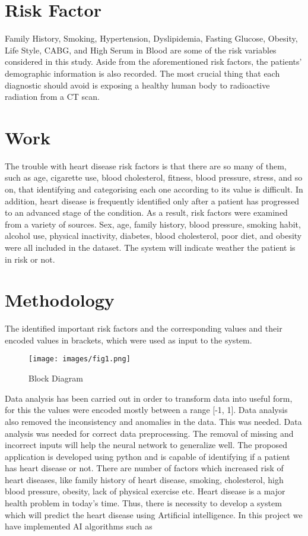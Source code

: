 \documentclass{article}
\begin{document}
\section{Risk Factor}
Family History, Smoking, Hypertension, Dyslipidemia, Fasting Glucose, Obesity, Life Style, CABG, and High Serum in Blood are some of the risk variables considered in this study. Aside from the aforementioned risk factors, the patients' demographic information is also recorded. The most crucial thing that each diagnostic should avoid is exposing a healthy human body to radioactive radiation from a CT scan.

\section{Work}
The trouble with heart disease risk factors is that there are so many of them, such as age, cigarette use, blood cholesterol, fitness, blood pressure, stress, and so on, that identifying and categorising each one according to its value is difficult. In addition, heart disease is frequently identified only after a patient has progressed to an advanced stage of the condition. As a result, risk factors were examined from a variety of sources. Sex, age, family history, blood pressure, smoking habit, alcohol use, physical inactivity, diabetes, blood cholesterol, poor diet, and obesity were all included in the dataset. The system will indicate weather the patient is in risk or not.

\section{Methodology}
The identified important risk factors and the corresponding values and their encoded values in brackets, which were used as input to the system.

\begin{figure}[H]
    \centering
    \texttt{[image: images/fig1.png]}
    \caption{Block Diagram}
    \label{fig:my_label}
\end{figure}

Data analysis has been carried out in order to transform data into useful form, for this the values were encoded mostly between a range [-1, 1]. Data analysis also removed the inconsistency and anomalies in the data. This was needed. Data analysis was needed for correct data preprocessing. The removal of missing and incorrect inputs will help the neural network to generalize well. The proposed application is developed using python and is capable of identifying if a patient has heart disease or not. There are number of factors which increased risk of heart diseases, like family history of heart disease, smoking, cholesterol, high blood pressure, obesity, lack of physical exercise etc. Heart disease is a major health problem in today’s time. Thus, there is necessity to develop a system which will predict the heart disease using Artificial intelligence. In this project we have implemented AI algorithms such as
\end{document}
